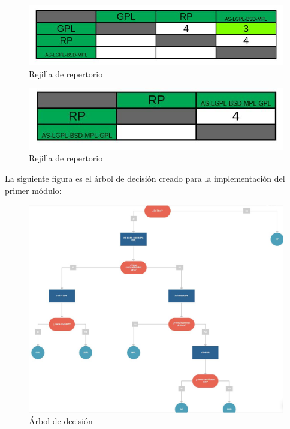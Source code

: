 \begin{figure}[H] %
	\centering
	\includegraphics[scale=0.48]{5} 
	\caption{Rejilla de repertorio} \label{etiq}
\end{figure}

\begin{figure}[H] %
	\centering
	\includegraphics[scale=0.48]{6} 
	\caption{Rejilla de repertorio} \label{etiq}
\end{figure}

La siguiente figura es el árbol de decisión creado para la implementación del primer módulo:

\begin{figure}[H] %
	\centering
	\includegraphics[scale=0.55]{7} 
	\caption{Árbol de decisión} \label{etiq}
\end{figure}

